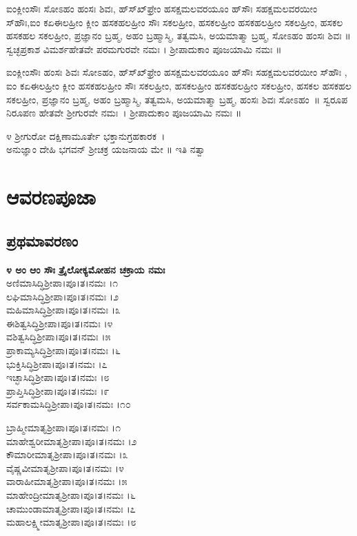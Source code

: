  ಐಂಕ್ಲೀಂಸೌಃ ಸೋಽಹಂ ಹಂಸಃ ಶಿವಃ, ಹ್‌ಸ್‌ಖ್‌ಫ್ರೇಂ ಹಸಕ್ಷಮಲವರಯೂಂ ಹ್‌ಸೌಃ ಸಹಕ್ಷಮಲವರಯೀಂ ಸ್‌ಹೌಃ,ಐಂ ಕಏಈಲಹ್ರೀಂ ಕ್ಲೀಂ ಹಸಕಹಲಹ್ರೀಂ ಸೌಃ  ಸಕಲಹ್ರೀಂ, ಹಸಕಲಹ್ರೀಂ ಹಸಕಹಲಹ್ರೀಂ ಸಕಲಹ್ರೀಂ, ಹಸಕಲ ಹಸಕಹಲ ಸಕಲಹ್ರೀಂ, ಪ್ರಜ್ಞಾನಂ ಬ್ರಹ್ಮ, ಅಹಂ ಬ್ರಹ್ಮಾಸ್ಮಿ, ತತ್ವಮಸಿ, ಅಯಮಾತ್ಮಾ ಬ್ರಹ್ಮ,  ಸೋಽಹಂ ಹಂಸಃ ಶಿವಃ ॥ ಸ್ವಚ್ಛಪ್ರಕಾಶ ವಿಮರ್ಶಹೇತವೇ ಪರಮಗುರವೇ ನಮಃ । ಶ್ರೀಪಾದುಕಾಂ ಪೂಜಯಾಮಿ ನಮಃ ॥

 ಐಂಕ್ಲೀಂಸೌಃ ಹಂಸಃ ಶಿವಃ ಸೋಽಹಂ, ಹ್‌ಸ್‌ಖ್‌ಫ್ರೇಂ ಹಸಕ್ಷಮಲವರಯೂಂ ಹ್‌ಸೌಃ ಸಹಕ್ಷಮಲವರಯೀಂ ಸ್‌ಹೌಃ , ಐಂ ಕಏಈಲಹ್ರೀಂ ಕ್ಲೀಂ ಹಸಕಹಲಹ್ರೀಂ ಸೌಃ  ಸಕಲಹ್ರೀಂ, ಹಸಕಲಹ್ರೀಂ ಹಸಕಹಲಹ್ರೀಂ ಸಕಲಹ್ರೀಂ, ಹಸಕಲ ಹಸಕಹಲ ಸಕಲಹ್ರೀಂ, ಪ್ರಜ್ಞಾನಂ ಬ್ರಹ್ಮ, ಅಹಂ ಬ್ರಹ್ಮಾಸ್ಮಿ, ತತ್ವಮಸಿ, ಅಯಮಾತ್ಮಾ ಬ್ರಹ್ಮ, ಹಂಸಃ ಶಿವಃ ಸೋಽಹಂ~॥ ಸ್ವರೂಪ ನಿರೂಪಣ ಹೇತವೇ ಶ್ರೀಗುರವೇ ನಮಃ~। ಶ್ರೀಪಾದುಕಾಂ ಪೂಜಯಾಮಿ ನಮಃ ॥

೪ ಶ್ರೀಗುರೋ ದಕ್ಷಿಣಾಮೂರ್ತೇ ಭಕ್ತಾನುಗ್ರಹಕಾರಕ~।\\
ಅನುಜ್ಞಾಂ ದೇಹಿ ಭಗವನ್ ಶ್ರೀಚಕ್ರ ಯಜನಾಯ ಮೇ ॥ ಇತಿ ನತ್ವಾ
\section{ಆವರಣಪೂಜಾ}

\subsection{ಪ್ರಥಮಾವರಣಂ}
{\bfseries ೪ ಅಂ ಆಂ ಸೌಃ ತ್ರೈಲೋಕ್ಯಮೋಹನ ಚಕ್ರಾಯ ನಮಃ }\\
 ಅಣಿಮಾಸಿದ್ಧಿಶ್ರೀಪಾ।ಪೂ।ತ।ನಮಃ ।೧\\
 ಲಘಿಮಾಸಿದ್ಧಿಶ್ರೀಪಾ।ಪೂ।ತ।ನಮಃ ।೨\\
 ಮಹಿಮಾಸಿದ್ಧಿಶ್ರೀಪಾ।ಪೂ।ತ।ನಮಃ ।೩\\
 ಈಶಿತ್ವಸಿದ್ಧಿಶ್ರೀಪಾ।ಪೂ।ತ।ನಮಃ ।೪\\
 ವಶಿತ್ವಸಿದ್ಧಿಶ್ರೀಪಾ।ಪೂ।ತ।ನಮಃ ।೫\\
 ಪ್ರಾಕಾಮ್ಯಸಿದ್ಧಿಶ್ರೀಪಾ।ಪೂ।ತ।ನಮಃ ।೬\\
 ಭುಕ್ತಿಸಿದ್ಧಿಶ್ರೀಪಾ।ಪೂ।ತ।ನಮಃ ।೭\\
 ಇಚ್ಛಾಸಿದ್ಧಿಶ್ರೀಪಾ।ಪೂ।ತ।ನಮಃ ।೮\\
 ಪ್ರಾಪ್ತಿಸಿದ್ಧಿಶ್ರೀಪಾ।ಪೂ।ತ।ನಮಃ ।೯\\
 ಸರ್ವಕಾಮಸಿದ್ಧಿಶ್ರೀಪಾ।ಪೂ।ತ।ನಮಃ ।೧೦

 ಬ್ರಾಹ್ಮೀಮಾತೃಶ್ರೀಪಾ।ಪೂ।ತ।ನಮಃ ।೧\\
 ಮಾಹೇಶ್ವರೀಮಾತೃಶ್ರೀಪಾ।ಪೂ।ತ।ನಮಃ ।೨\\
 ಕೌಮಾರೀಮಾತೃಶ್ರೀಪಾ।ಪೂ।ತ।ನಮಃ ।೩\\
 ವೈಷ್ಣವೀಮಾತೃಶ್ರೀಪಾ।ಪೂ।ತ।ನಮಃ ।೪\\
 ವಾರಾಹೀಮಾತೃಶ್ರೀಪಾ।ಪೂ।ತ।ನಮಃ ।೫\\
 ಮಾಹೇಂದ್ರೀಮಾತೃಶ್ರೀಪಾ।ಪೂ।ತ।ನಮಃ ।೬\\
 ಚಾಮುಂಡಾಮಾತೃಶ್ರೀಪಾ।ಪೂ।ತ।ನಮಃ ।೭\\
 ಮಹಾಲಕ್ಷ್ಮೀಮಾತೃಶ್ರೀಪಾ।ಪೂ।ತ।ನಮಃ ।೮

